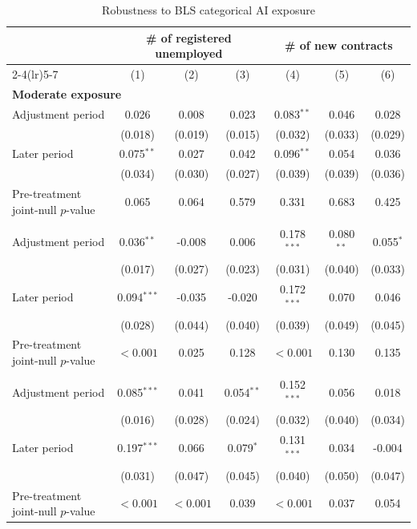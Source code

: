 \begin{table}[H]
\centering
\caption{Robustness to BLS categorical AI exposure}
\label{tab:v1_bls_exposure}
\begin{threeparttable}
\scriptsize
\setlength{\tabcolsep}{3pt}
\begin{tabular}{lcccccc}
\toprule
& \multicolumn{3}{c}{\# of registered unemployed} & \multicolumn{3}{c}{\# of new contracts} \\
\cmidrule(lr){2-4}\cmidrule(lr){5-7}
& (1) & (2) & (3) & (4) & (5) & (6) \\
\midrule
\multicolumn{7}{l}{\textbf{Moderate exposure}} \\
Adjustment period & 0.026 & 0.008 & 0.023 & 0.083$^{**}$ & 0.046 & 0.028 \\
 & (0.018) & (0.019) & (0.015) & (0.032) & (0.033) & (0.029) \\
Later period & 0.075$^{**}$ & 0.027 & 0.042 & 0.096$^{**}$ & 0.054 & 0.036 \\
 & (0.034) & (0.030) & (0.027) & (0.039) & (0.039) & (0.036) \\
Pre-treatment joint-null $p$-value & 0.065 & 0.064 & 0.579 & 0.331 & 0.683 & 0.425 \\
\addlinespace[4pt]
\multicolumn{7}{l}{\textbf{High exposure}} \\
Adjustment period & 0.036$^{**}$ & -0.008 & 0.006 & 0.178$^{***}$ & 0.080$^{**}$ & 0.055$^{*}$ \\
 & (0.017) & (0.027) & (0.023) & (0.031) & (0.040) & (0.033) \\
Later period & 0.094$^{***}$ & -0.035 & -0.020 & 0.172$^{***}$ & 0.070 & 0.046 \\
 & (0.028) & (0.044) & (0.040) & (0.039) & (0.049) & (0.045) \\
Pre-treatment joint-null $p$-value & $<0.001$ & 0.025 & 0.128 & $<0.001$ & 0.130 & 0.135 \\
\addlinespace[4pt]
\multicolumn{7}{l}{\textbf{Very high exposure}} \\
Adjustment period & 0.085$^{***}$ & 0.041 & 0.054$^{**}$ & 0.152$^{***}$ & 0.056 & 0.018 \\
 & (0.016) & (0.028) & (0.024) & (0.032) & (0.040) & (0.034) \\
Later period & 0.197$^{***}$ & 0.066 & 0.079$^{*}$ & 0.131$^{***}$ & 0.034 & -0.004 \\
 & (0.031) & (0.047) & (0.045) & (0.040) & (0.050) & (0.047) \\
Pre-treatment joint-null $p$-value & $<0.001$ & $<0.001$ & 0.039 & $<0.001$ & 0.037 & 0.054 \\

\end{tabular}
\end{threeparttable}
\end{table}
